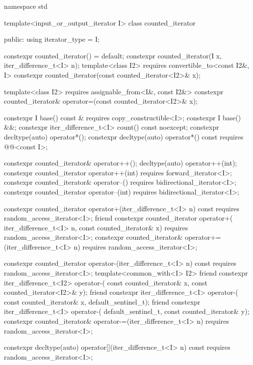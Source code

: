 %
\begin{codeblock}
namespace std {
  template<input_or_output_iterator I>
  class counted_iterator {
  public:
    using iterator_type = I;

    constexpr counted_iterator() = default;
    constexpr counted_iterator(I x, iter_difference_t<I> n);
    template<class I2>
      requires convertible_to<const I2&, I>
        constexpr counted_iterator(const counted_iterator<I2>& x);

    template<class I2>
      requires assignable_from<I&, const I2&>
        constexpr counted_iterator& operator=(const counted_iterator<I2>& x);

    constexpr I base() const & requires copy_constructible<I>;
    constexpr I base() &&;
    constexpr iter_difference_t<I> count() const noexcept;
    constexpr decltype(auto) operator*();
    constexpr decltype(auto) operator*() const
      requires @@<const I>;

    constexpr counted_iterator& operator++();
    decltype(auto) operator++(int);
    constexpr counted_iterator operator++(int)
      requires forward_iterator<I>;
    constexpr counted_iterator& operator--()
      requires bidirectional_iterator<I>;
    constexpr counted_iterator operator--(int)
      requires bidirectional_iterator<I>;

    constexpr counted_iterator operator+(iter_difference_t<I> n) const
      requires random_access_iterator<I>;
    friend constexpr counted_iterator operator+(
      iter_difference_t<I> n, const counted_iterator& x)
        requires random_access_iterator<I>;
    constexpr counted_iterator& operator+=(iter_difference_t<I> n)
      requires random_access_iterator<I>;

    constexpr counted_iterator operator-(iter_difference_t<I> n) const
      requires random_access_iterator<I>;
    template<common_with<I> I2>
      friend constexpr iter_difference_t<I2> operator-(
        const counted_iterator& x, const counted_iterator<I2>& y);
    friend constexpr iter_difference_t<I> operator-(
      const counted_iterator& x, default_sentinel_t);
    friend constexpr iter_difference_t<I> operator-(
      default_sentinel_t, const counted_iterator& y);
    constexpr counted_iterator& operator-=(iter_difference_t<I> n)
      requires random_access_iterator<I>;

    constexpr decltype(auto) operator[](iter_difference_t<I> n) const
      requires random_access_iterator<I>;

}}
\end{codeblock}
